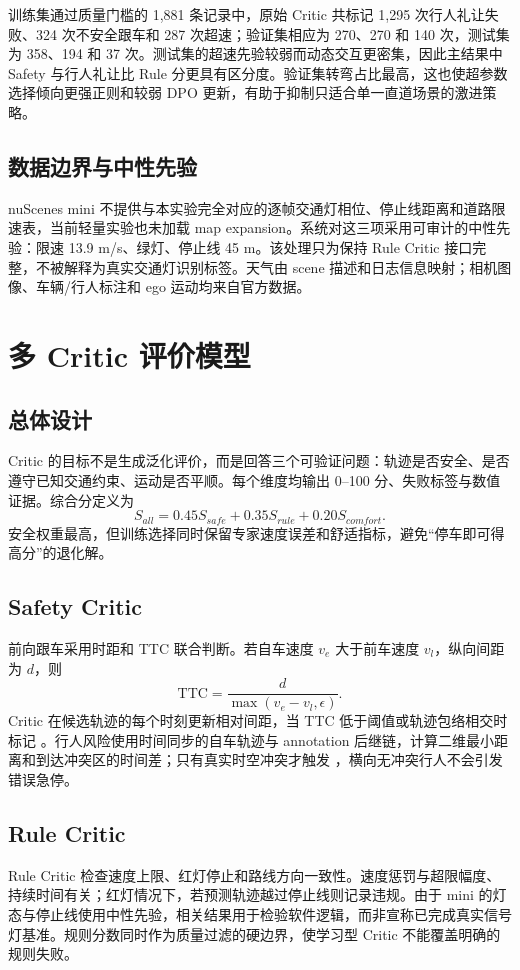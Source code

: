 \documentclass[UTF8,a4paper,12pt,fontset=fandol]{ctexart}
\begin{document}
训练集通过质量门槛的 1,881 条记录中，原始 Critic 共标记 1,295 次行人礼让失败、324 次不安全跟车和 287 次超速；验证集相应为 270、270 和 140 次，测试集为 358、194 和 37 次。测试集的超速先验较弱而动态交互更密集，因此主结果中 Safety 与行人礼让比 Rule 分更具有区分度。验证集转弯占比最高，这也使超参数选择倾向更强正则和较弱 DPO 更新，有助于抑制只适合单一直道场景的激进策略。

\subsection{数据边界与中性先验}
nuScenes mini 不提供与本实验完全对应的逐帧交通灯相位、停止线距离和道路限速表，当前轻量实验也未加载 map expansion。系统对这三项采用可审计的中性先验：限速 13.9 m/s、绿灯、停止线 45 m。该处理只为保持 Rule Critic 接口完整，不被解释为真实交通灯识别标签。天气由 scene 描述和日志信息映射；相机图像、车辆/行人标注和 ego 运动均来自官方数据。

\section{多 Critic 评价模型}
\subsection{总体设计}
Critic 的目标不是生成泛化评价，而是回答三个可验证问题：轨迹是否安全、是否遵守已知交通约束、运动是否平顺。每个维度均输出 0--100 分、失败标签与数值证据。综合分定义为
\begin{equation}
S_{all}=0.45S_{safe}+0.35S_{rule}+0.20S_{comfort}.
\end{equation}
安全权重最高，但训练选择同时保留专家速度误差和舒适指标，避免“停车即可得高分”的退化解。

\subsection{Safety Critic}
前向跟车采用时距和 TTC 联合判断。若自车速度 $v_e$ 大于前车速度 $v_l$，纵向间距为 $d$，则
\begin{equation}
 \mathrm{TTC}=\frac{d}{\max(v_e-v_l,\epsilon)}.
\end{equation}
Critic 在候选轨迹的每个时刻更新相对间距，当 TTC 低于阈值或轨迹包络相交时标记 。行人风险使用时间同步的自车轨迹与 annotation 后继链，计算二维最小距离和到达冲突区的时间差；只有真实时空冲突才触发 ，横向无冲突行人不会引发错误急停。

\subsection{Rule Critic}
Rule Critic 检查速度上限、红灯停止和路线方向一致性。速度惩罚与超限幅度、持续时间有关；红灯情况下，若预测轨迹越过停止线则记录违规。由于 mini 的灯态与停止线使用中性先验，相关结果用于检验软件逻辑，而非宣称已完成真实信号灯基准。规则分数同时作为质量过滤的硬边界，使学习型 Critic 不能覆盖明确的规则失败。
\end{document}
